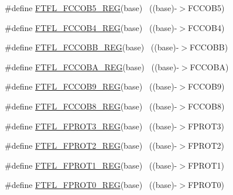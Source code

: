 \begin{DoxyCompactItemize}
\item 
\#define \hyperlink{group___f_t_f_l___register___accessor___macros_ga32f6aba32c376459e9d4245c477a2027}{F\+T\+F\+L\+\_\+\+F\+C\+C\+O\+B5\+\_\+\+R\+EG}(base)                                    ~((base)-\/$>$F\+C\+C\+O\+B5)
\item 
\#define \hyperlink{group___f_t_f_l___register___accessor___macros_gae0954f895054d630b956bf9c6655d98a}{F\+T\+F\+L\+\_\+\+F\+C\+C\+O\+B4\+\_\+\+R\+EG}(base)                                    ~((base)-\/$>$F\+C\+C\+O\+B4)
\item 
\#define \hyperlink{group___f_t_f_l___register___accessor___macros_ga3dae4e4d06922c93a79de6c1e2eee6e5}{F\+T\+F\+L\+\_\+\+F\+C\+C\+O\+B\+B\+\_\+\+R\+EG}(base)                                    ~((base)-\/$>$F\+C\+C\+O\+BB)
\item 
\#define \hyperlink{group___f_t_f_l___register___accessor___macros_ga694b40aa4457cef10f42dedada1ae800}{F\+T\+F\+L\+\_\+\+F\+C\+C\+O\+B\+A\+\_\+\+R\+EG}(base)                                    ~((base)-\/$>$F\+C\+C\+O\+BA)
\item 
\#define \hyperlink{group___f_t_f_l___register___accessor___macros_ga74b5065eee73b2f0cf777d95ef32eaf9}{F\+T\+F\+L\+\_\+\+F\+C\+C\+O\+B9\+\_\+\+R\+EG}(base)                                    ~((base)-\/$>$F\+C\+C\+O\+B9)
\item 
\#define \hyperlink{group___f_t_f_l___register___accessor___macros_ga5121541dc5124f6d4dbf91c6ff37f4eb}{F\+T\+F\+L\+\_\+\+F\+C\+C\+O\+B8\+\_\+\+R\+EG}(base)                                    ~((base)-\/$>$F\+C\+C\+O\+B8)
\item 
\#define \hyperlink{group___f_t_f_l___register___accessor___macros_ga3e7662648ae40179bc1b22849a460b6a}{F\+T\+F\+L\+\_\+\+F\+P\+R\+O\+T3\+\_\+\+R\+EG}(base)                                    ~((base)-\/$>$F\+P\+R\+O\+T3)
\item 
\#define \hyperlink{group___f_t_f_l___register___accessor___macros_ga3d2ae39f0e6774e167ee98627f68dd7a}{F\+T\+F\+L\+\_\+\+F\+P\+R\+O\+T2\+\_\+\+R\+EG}(base)                                    ~((base)-\/$>$F\+P\+R\+O\+T2)
\item 
\#define \hyperlink{group___f_t_f_l___register___accessor___macros_ga85bbb8d73e9e3ed4ef8a2092ad6e9f8f}{F\+T\+F\+L\+\_\+\+F\+P\+R\+O\+T1\+\_\+\+R\+EG}(base)                                    ~((base)-\/$>$F\+P\+R\+O\+T1)
\item 
\#define \hyperlink{group___f_t_f_l___register___accessor___macros_gadbe6ebb9c0f6665200249c5295cc8947}{F\+T\+F\+L\+\_\+\+F\+P\+R\+O\+T0\+\_\+\+R\+EG}(base)                                    ~((base)-\/$>$F\+P\+R\+O\+T0)

\end{DoxyCompactItemize}
